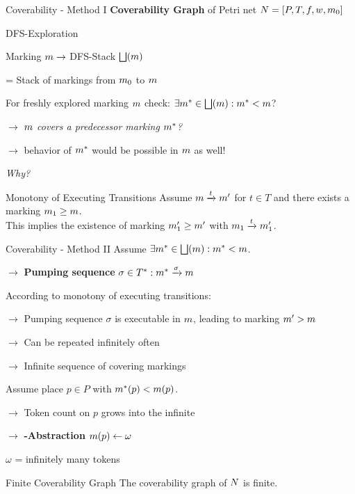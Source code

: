 \documentclass[11pt]{presentation}
\begin{document}
\begin{frame}{Coverability - Method I}
	\textbf{Coverability Graph} of Petri net $ \pn[=] $

	\medskip

	DFS-Exploration

	\medskip
	Marking $ \marking \rightarrow $ DFS-Stack $ \stack(\marking) $

	= Stack of markings from $ \marking[0] $ to $ \marking $

	\bigskip
	For freshly explored marking $ \marking $ check: $ \exists \marking^* \in \stack(\marking) : \marking^* < \marking $?

	$ \rightarrow $ \emph{$ \marking $ covers a predecessor marking $ \marking^* $?}

	$ \rightarrow $ behavior of $ \marking^* $ would be possible in $ \marking $ as well!

	\medskip
	\emph{Why?}
	\begin{merke}{Monotony of Executing Transitions}{}
		Assume $ \marking \xrightarrow{t} \marking^\prime $ for $ t \in T $ and there exists a marking $ \marking_1 \geq \marking $.\\
		This implies the existence of marking $ \marking_1^\prime \geq \marking^\prime $ with $ \marking_1 \xrightarrow{t} \marking_1^\prime $.
	\end{merke}
\end{frame}

\begin{frame}{Coverability - Method II}
	Assume $ \exists \marking^* \in \stack(\marking) : \marking^* < \marking $.

	$ \rightarrow $ \textbf{Pumping sequence} $ \sigma \in T^*: \marking^* \xrightarrow{\sigma} \marking $


	\medskip
	According to monotony of executing transitions:

	$ \rightarrow $ Pumping sequence $ \sigma $ is executable in $ \marking $, leading to marking $ \marking^\prime > \marking  $

	$ \rightarrow $ Can be repeated infinitely often

	$ \rightarrow $ Infinite sequence of covering markings

	\medskip

	Assume place $ p \in P $ with $ \marking^*(p) < \marking(p) $.

	$ \rightarrow $ Token count on $ p $ grows into the infinite



	\smallskip
	$ \rightarrow $  \textbf{-Abstraction} $ \marking(p) \leftarrow \omega $

	\hspace{0.3cm} $ \omega $ = infinitely many tokens

	\begin{satz}{Finite Coverability Graph \cite{karp_parallel_1969}}{}
		The coverability graph of $ \pn $ is finite.
	\end{satz}
\end{frame}
\end{document}
